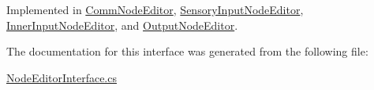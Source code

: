 Implemented in \mbox{\hyperlink{class_comm_node_editor_ad578649fe7c3775e0b91c1acdb5e738a}{Comm\+Node\+Editor}}, \mbox{\hyperlink{class_sensory_input_node_editor_ab6f6a94004254d8bba213a6e91fcc946}{Sensory\+Input\+Node\+Editor}}, \mbox{\hyperlink{class_inner_input_node_editor_a211d3bfaad897b853671c9c61366779f}{Inner\+Input\+Node\+Editor}}, and \mbox{\hyperlink{class_output_node_editor_afca854ca2a34703a1becfee48da12631}{Output\+Node\+Editor}}.



The documentation for this interface was generated from the following file\+:\begin{DoxyCompactItemize}
\item 
\mbox{\hyperlink{_node_editor_interface_8cs}{Node\+Editor\+Interface.\+cs}}\end{DoxyCompactItemize}
